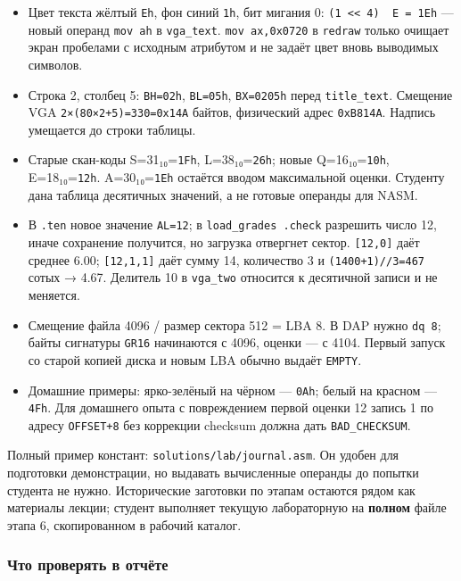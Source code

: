 \begin{itemize}
\tightlist
\item
  Цвет текста жёлтый \texttt{Eh}, фон синий \texttt{1h}, бит мигания 0:
  \texttt{(1\ \textless{}\textless{}\ 4)\ \textbar{}\ E\ =\ 1Eh} ---
  новый операнд \texttt{mov\ ah} в \texttt{vga\_text}.
  \texttt{mov\ ax,0x0720} в \texttt{redraw} только очищает экран
  пробелами с исходным атрибутом и не задаёт цвет вновь выводимых
  символов.
\item
  Строка 2, столбец 5: \texttt{BH=02h}, \texttt{BL=05h},
  \texttt{BX=0205h} перед \texttt{title\_text}. Смещение VGA
  \texttt{2×(80×2+5)=330=0x14A} байтов, физический адрес
  \texttt{0xB814A}. Надпись умещается до строки таблицы.
\item
  Старые скан-коды S=31₁₀=\texttt{1Fh}, L=38₁₀=\texttt{26h}; новые
  Q=16₁₀=\texttt{10h}, E=18₁₀=\texttt{12h}. A=30₁₀=\texttt{1Eh} остаётся
  вводом максимальной оценки. Студенту дана таблица десятичных значений,
  а не готовые операнды для NASM.
\item
  В \texttt{.ten} новое значение \texttt{AL=12}; в
  \texttt{load\_grades\ .check} разрешить число 12, иначе сохранение
  получится, но загрузка отвергнет сектор. \texttt{{[}12,0{]}} даёт
  среднее 6.00; \texttt{{[}12,1,1{]}} даёт сумму 14, количество 3 и
  \texttt{(1400+1)//3=467} сотых → 4.67. Делитель 10 в \texttt{vga\_two}
  относится к десятичной записи и не меняется.
\item
  Смещение файла 4096 / размер сектора 512 = LBA 8. В DAP нужно
  \texttt{dq\ 8}; байты сигнатуры \texttt{GR16} начинаются с 4096,
  оценки --- с 4104. Первый запуск со старой копией диска и новым LBA
  обычно выдаёт \texttt{EMPTY}.
\item
  Домашние примеры: ярко-зелёный на чёрном --- \texttt{0Ah}; белый на
  красном --- \texttt{4Fh}. Для домашнего опыта с повреждением первой
  оценки 12 запись 1 по адресу \texttt{OFFSET+8} без коррекции checksum
  должна дать \texttt{BAD\_CHECKSUM}.
\end{itemize}

Полный пример констант: \texttt{solutions/lab/journal.asm}. Он удобен
для подготовки демонстрации, но выдавать вычисленные операнды до попытки
студента не нужно. Исторические заготовки по этапам остаются рядом как
материалы лекции; студент выполняет текущую лабораторную на
\textbf{полном} файле этапа 6, скопированном в рабочий каталог.

\hypertarget{ux447ux442ux43e-ux43fux440ux43eux432ux435ux440ux44fux442ux44c-ux432-ux43eux442ux447ux451ux442ux435}{%
\subsubsection{Что проверять в
отчёте}\label{ux447ux442ux43e-ux43fux440ux43eux432ux435ux440ux44fux442ux44c-ux432-ux43eux442ux447ux451ux442ux435}}


